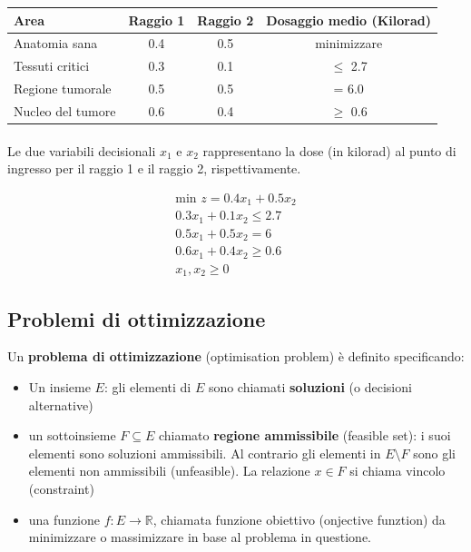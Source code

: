 \documentclass[a4paper, 11pt]{article}
\begin{document}
            \begin{table}[ht]
                \centering
                \begin{tabular}{|l|c|c|c|}
                \hline
                \textbf{Area}               & \textbf{Raggio 1} & \textbf{Raggio 2} & \textbf{Dosaggio medio (Kilorad)} \\ \hline
                Anatomia sana & 0.4  & 0.5  & minimizzare \\ 
                Tessuti critici & 0.3  & 0.1  & $\le$ 2.7 \\ 
                Regione tumorale & 0.5  & 0.5  & = 6.0 \\ 
                Nucleo del tumore & 0.6  & 0.4  & $\ge$ 0.6 \\ \hline
                \end{tabular}
            \end{table}

            \paragraph{}
            Le due variabili decisionali $x_1$ e $x_2$ rappresentano la dose (in kilorad) al punto di ingresso per il raggio 1 e il raggio 2, rispettivamente.
            
            \begin{align*}
                \text{min } z = 0.4x_1 + 0.5x_2 \\
                0.3x_1 + 0.1x_2 \le 2.7 \\
                0.5x_1 + 0.5x_2 = 6 \\
                0.6x_1 + 0.4x_2 \ge 0.6 \\
                x_1, x_2 \ge 0
            \end{align*}

        \pagebreak








        
    \subsection{Problemi di ottimizzazione}
        Un \textbf{problema di ottimizzazione} (optimisation problem) è definito specificando:

        \begin{itemize}
            \item Un insieme $E$: gli elementi di $E$ sono chiamati \textbf{soluzioni} (o decisioni alternative)
            \item un sottoinsieme $F \subseteq  E$ chiamato \textbf{regione ammissibile} (feasible set): i suoi elementi sono soluzioni ammissibili. Al contrario gli elementi in $E\setminus F$ sono gli elementi non ammissibili (unfeasible). 
            La relazione $x \in F$ si chiama vincolo (constraint)
            \item una funzione $f : E \to \mathbb{R}$, chiamata funzione obiettivo (onjective funztion) da minimizzare o massimizzare in base al problema in questione. 
        \end{itemize}
\end{document}
